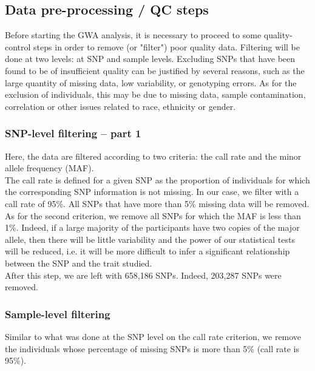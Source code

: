 \documentclass[a4paper, 12pt]{article}
\begin{document}
\subsection{Data pre-processing / QC steps}

Before starting the GWA analysis, it is necessary to proceed to some quality-control steps in order to remove (or "filter") poor quality data. Filtering will be done at two levels: at SNP and sample levels. Excluding SNPs that have been found to be of insufficient quality can be justified by several reasons, such as the large quantity of missing data, low variability, or genotyping errors. As for the exclusion of individuals, this may be due to missing data, sample contamination, correlation or other issues related to race, ethnicity or gender. 

\subsubsection*{SNP-level filtering -- part 1}

Here, the data are filtered according to two criteria: the call rate and the minor allele frequency (MAF). \\

The call rate is defined for a given SNP as the proportion of individuals for which the corresponding SNP information is not missing. In our case, we filter with a call rate of 95\%. All SNPs that have more than 5\% missing data will be removed. \\

As for the second criterion, we remove all SNPs for which the MAF is less than 1\%. Indeed, if a large majority of the participants have two copies of the major allele, then there will be little variability and the power of our statistical tests will be reduced, i.e. it will be more difficult to infer a significant relationship between the SNP and the trait studied. \\

After this step, we are left with 658,186 SNPs. Indeed, 203,287 SNPs were removed. 

\subsubsection*{Sample-level filtering}

Similar to what was done at the SNP level on the call rate criterion, we remove the individuals whose percentage of missing SNPs is more than 5\% (call rate is 95\%). \\
\end{document}
